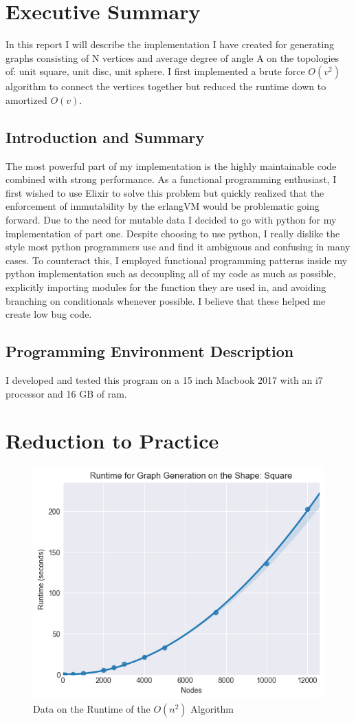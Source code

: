 \documentclass{article}
\begin{document}
  \section{Executive Summary}
	In this report I will describe the implementation I have created for generating graphs consisting of N vertices and average degree of angle A on the topologies of: unit square, unit disc, unit sphere.
	I first implemented a brute force $O(v^2)$ algorithm to connect the vertices together but reduced the runtime down to amortized $O(v)$.
  \subsection{Introduction and Summary}
	The most powerful part of my implementation is the highly maintainable code combined with strong performance. 
	As a functional programming enthusiast, I first wished to use Elixir to solve this problem but quickly realized that the enforcement of immutability by the erlangVM would be problematic going forward.
	Due to the need for mutable data I decided to go with python for my implementation of part one.
	Despite choosing to use python, I really dislike the style most python programmers use and find it ambiguous and confusing in many cases.
	To counteract this, I employed functional programming patterns inside my python implementation such as decoupling all of my code as much as possible, explicitly importing modules for the function they are used in, and avoiding branching on conditionals whenever possible.
	I believe that these helped me create low bug code.
  \subsection{Programming Environment Description}
	I developed and tested this program on a 15 inch Macbook 2017 with an i7 processor and 16 GB of ram.
  \section{Reduction to Practice}

  \begin{figure}[!htb]
    \centering
    \includegraphics[width=0.5 \textwidth]{square/runtime/runtime_chart_naive}
    \caption{Data on the Runtime of the $O(n^2)$ Algorithm}
  \end{figure}
\end{document}
